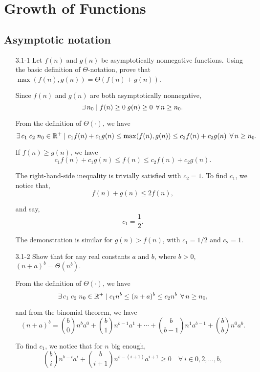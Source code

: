 \chapter{Growth of Functions}

\section{Asymptotic notation}

\begin{enumerate}

\item[3.1{-}1]{Let $f(n)$ and $g(n)$ be asymptotically nonnegative functions.
  Using the basic definition of $\Theta$-notation, prove that
  $\max(f(n), g(n)) = \Theta(f(n) + g(n))$.}

\begin{framed}
Since $f(n)$ and $g(n)$ are both asymptotically nonnegative,
\[
\operatorname{\exists} n_0 \mid f(n) \ge 0\;g(n) \ge 0\;\operatorname{\forall} n \ge n_0.
\]

From the definition of $\Theta(\cdot)$, we have
\[
\operatorname{\exists} c_1\;c_2\;n_0\in\mathbb{R}^+ \mid
c_1 f(n) + c_1 g(n) \le \max(f(n), g(n)) \le c_2 f(n) + c_2 g(n)\;
\operatorname{\forall} n \ge n_0.
\]

If $f(n) \ge g(n)$, we have
\[
c_1 f(n) + c_1 g(n) \le f(n) \le c_2 f(n) + c_2 g(n).
\]


The right-hand-side inequality is trivially satisfied with $c_2 = 1$. To find
\(c_1\), we notice that,
\[
f(n) + g(n) \le 2f(n),
\]

and say,
\[
c_1 = \frac{1}{2}.
\]

The demonstration is similar for $g(n) > f(n)$, with $c_1 = 1/2$ and $c_2 = 1$.
\end{framed}

\item[3.1{-}2]{Show that for any real constants $a$ and $b$, where
$b > 0$, $(n + a)^b = \Theta(n^b)$.}

\begin{framed}
From the definition of \(\Theta(\cdot)\), we have
\[
\operatorname{\exists} c_1\;c_2\;n_0\in\mathbb{R}^+ \mid c_1 n^b \leq (n+a)^b \leq c_2 n^b\;
\operatorname{\forall} n \ge n_0,
\]

and from the binomial theorem, we have
\[
(n + a)^b = \binom{b}{0} n^b a^0 + \binom{b}{1} n^{b - 1} a^1 + \cdots +
            \binom{b}{b - 1} n^1 a^{b - 1} + \binom{b}{b} n^0 a^b.
\]

To find \(c_1\), we notice that for $n$ big enough,
\[
\binom{b}{i} n^{b - i} a^i + \binom{b}{i + 1} n^{b - (i + 1)} a^{i + 1} \ge 0
\quad \forall\ i \in 0, 2, \dots ,b,
\]


\end{framed}
\end{enumerate}
